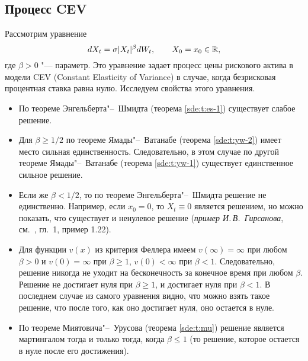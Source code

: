 \subsection{Процесс CEV}

Рассмотрим уравнение
\begin{equation}
\label{sde:cev}
d X_t = \sigma |X_t|^\beta d W_t, \qquad X_0=x_0\in \mathbb{R},
\end{equation}
где $\beta>0$ "--- параметр.
Это уравнение задает процесс цены рискового актива в модели CEV (Constant Elasticity of Variance) в случае, когда безрисковая процентная ставка равна нулю.
Исследуем свойства этого уравнения.

\begin{itemize}
\item По теореме Энгельберта"--~Шмидта (теорема \ref{sde:t:es-1}) существует слабое решение.

\item Для $\beta\ge1/2$ по теореме Ямады"--~Ватанабе (теорема \ref{sde:t:yw-2}) имеет место сильная единственность.
Следовательно, в этом случае по другой теореме Ямады"--~Ватанабе (теорема \ref{sde:t:yw-1}) существует единственное сильное решение.

\item Если же $\beta< 1/2$, то по теореме Энгельберта"--~Шмидта решение не единственно.
Например, если $x_0=0$, то $X_t\equiv0$ является решением, но можно показать, что существует и ненулевое решение (\emph{пример И.\,В.~Гирсанова}, см.~\cite{ChernyEngelbert}, гл.~1, пример 1.22).

\item Для функции $v(x)$ из критерия Феллера имеем $v(\infty) = \infty$ при любом $\beta>0$ и $v(0) = \infty$ при $\beta\ge 1$, $v(0)<\infty$ при $\beta <1$.
Следовательно, решение никогда не уходит на бесконечность за конечное время при любом $\beta$.
Решение не достигает нуля при $\beta\ge1$, и достигает нуля при $\beta<1$.
В последнем случае из самого уравнения видно, что можно взять такое решение, что после того, как оно достигает нуля, оно остается в нуле.

\item По теореме Миятовича"--~Урусова (теорема \ref{sde:t:mu}) решение является мартингалом тогда и только тогда, когда $\beta\le 1$ (то решение, которое остается в нуле после его достижения).
\end{itemize}


